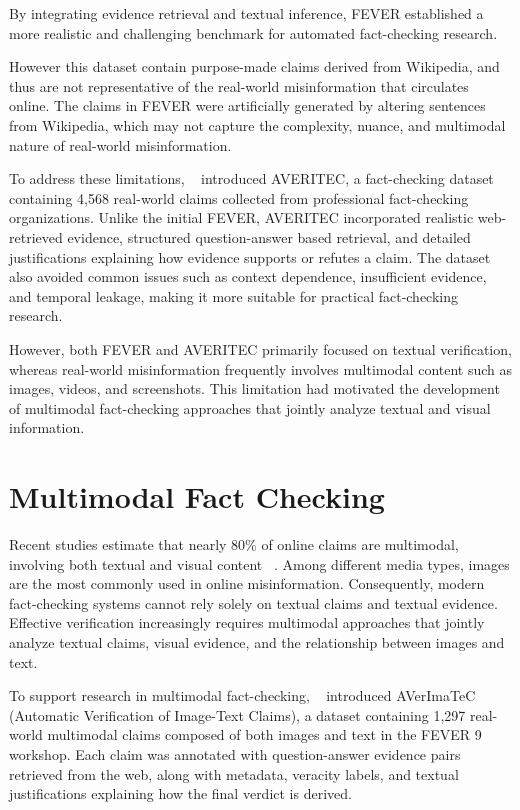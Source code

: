 By integrating evidence retrieval and textual inference, FEVER established a more realistic and challenging benchmark for automated fact-checking research.

However this dataset contain purpose-made claims derived from Wikipedia, and thus are not representative of the real-world misinformation that circulates online. The claims in FEVER were artificially generated by altering sentences from Wikipedia, which may not capture the complexity, nuance, and multimodal nature of real-world misinformation.

To address these limitations, ~\citet{Schlichtkrull2023May} introduced AVERITEC, a fact-checking dataset containing 4,568 real-world claims collected from professional fact-checking organizations. Unlike the initial FEVER, AVERITEC incorporated realistic web-retrieved evidence, structured question-answer based retrieval, and detailed justifications explaining how evidence supports or refutes a claim. The dataset also avoided common issues such as context dependence, insufficient evidence, and temporal leakage, making it more suitable for practical fact-checking research.

However, both FEVER and AVERITEC primarily focused on textual verification, whereas real-world misinformation frequently involves multimodal content such as images, videos, and screenshots. This limitation had motivated the development of multimodal fact-checking approaches that jointly analyze textual and visual information.

\section{Multimodal Fact Checking}

Recent studies estimate that nearly 80\% of online claims are multimodal, involving both textual and visual content ~\cite{Dufour2024May}. Among different media types, images are the most commonly used in online misinformation. Consequently, modern fact-checking systems cannot rely solely on textual claims and textual evidence. Effective verification increasingly requires multimodal approaches that jointly analyze textual claims, visual evidence, and the relationship between images and text.

To support research in multimodal fact-checking, ~\citet{Cao2025May} introduced AVerImaTeC  (Automatic Verification of Image-Text Claims), a dataset containing 1,297 real-world multimodal claims composed of both images and text in the FEVER 9 workshop. Each claim was annotated with question-answer evidence pairs retrieved from the web, along with metadata, veracity labels, and textual justifications explaining how the final verdict is derived.

